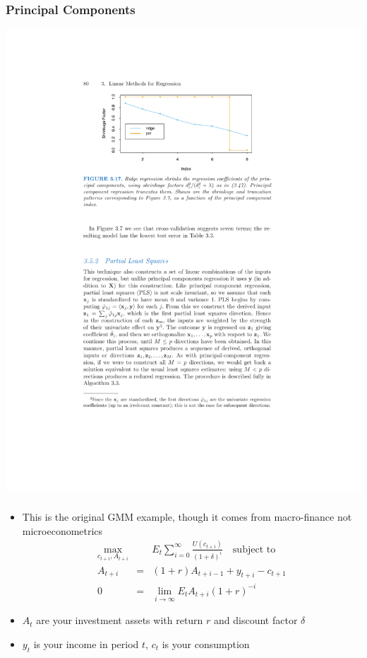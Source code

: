 \begin{frame}
\frametitle{Principal Components}
\begin{center}
\includegraphics[height=0.85\textheight]{./resources/pcrridge}
\end{center}
\end{frame}



\begin{frame}
\frametitle{\citet{hansen1982generalized}}
\begin{itemize}
\item This is the original GMM example, though it comes from macro-finance not microeconometrics
\begin{eqnarray*}
\max_{c_{t+i},A_{t+i}}&& E_t \sum_{i=0}^{\infty} \frac{U(c_{t+i})}{(1+\delta)^i} \quad \mbox{subject to } \\
A_{t+i} &=& (1+r) A_{t+i-1} + y_{t+i} - c_{t+1} \\
0&=&\lim_{i \rightarrow \infty} E_t A_{t+i} (1+r)^{-i} 
\end{eqnarray*}
\item $A_t$ are your investment assets with return $r$ and discount factor $\delta$
\item $y_t$ is your income in period $t$, $c_t$ is your consumption 
\end{itemize}
\end{frame}

